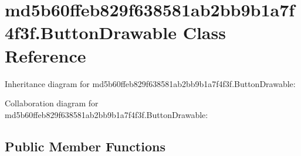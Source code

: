 \hypertarget{classmd5b60ffeb829f638581ab2bb9b1a7f4f3f_1_1_button_drawable}{}\section{md5b60ffeb829f638581ab2bb9b1a7f4f3f.\+Button\+Drawable Class Reference}
\label{classmd5b60ffeb829f638581ab2bb9b1a7f4f3f_1_1_button_drawable}


Inheritance diagram for md5b60ffeb829f638581ab2bb9b1a7f4f3f.\+Button\+Drawable\+:


Collaboration diagram for md5b60ffeb829f638581ab2bb9b1a7f4f3f.\+Button\+Drawable\+:
\subsection*{Public Member Functions}
